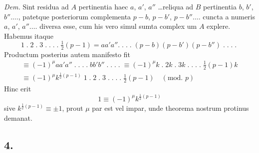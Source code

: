 \documentclass[14pt]{memoir}
\begin{document}
\textit{Dem.} Sint residua ad \(A\) pertinentia haec \(a\), \(a'\), \(a''\)  \ldots reliqua ad \(B\) pertinentia \(b\), \(b'\), \(b''.  \ldots\), patetque posteriorum complementa \(p-b\), \(p-b'\), \(p-b''. \ldots\) cuncta a numeris \(a\), \(a'\), \(a''. \ldots\) diversa esse, cum his vero simul sumta complex%
um \(A\) explere. Habemus itaque 
\[ 1\;.\;2\;.\;3\;.\;.\;.\;.\;\tfrac{1}{2}(p-1) = a a' a''.\;.\;.\;.\;(p-b)(p-b')(p-b'')\;.\;.\;.\;.\; \]
Productum posterius autem manifesto fit 
\[\begin{array}{l} \equiv (-1)^{\mu} aa'a''\;.\;.\;.\;.\;bb'b''\;.\;.\;.\;.\;\equiv(-1)^\mu k \;.\; 2k \;.\; 3k\;.\;.\;.\;.\; \tfrac{1}{2}(p-1)k \\
\equiv (-1)^\mu k^{\frac{1}{2}(p-1)} \;1 \;.\; 2 \;.\; 3 \;.\;.\;.\;.\; \tfrac{1}{2}(p-1) \quad (\textrm{mod. }p)  \end{array}\]
Hinc erit 
\[ 1 \equiv (-1)^{\mu} k^{\frac{1}{2}(p-1)} \]
sive \(k^{\frac{1}{2}(p-1)} \equiv \pm 1\), prout \(\mu\) par est vel impar, unde theorema nostrum protinus demanat. 


\subsection*{4.}
 
\end{document}
